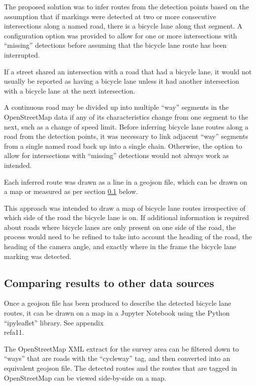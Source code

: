 \documentclass[11pt,twoside]{report}
\begin{document}
The proposed solution was to infer routes from the detection points based on the assumption that if markings were detected at two or more consecutive intersections along a named road, there is a bicycle lane along that segment.  A configuration option was provided to allow for one or more intersections with ``missing'' detections before assuming that the bicycle lane route has been interrupted.

If a street shared an intersection with a road that had a bicycle lane, it would not usually be reported as having a bicycle lane unless it had another intersection with a bicycle lane at the next intersection.

A continuous road may be divided up into multiple ``way'' segments in the OpenStreetMap data if any of its characteristics change from one segment to the next, such as a change of speed limit.  Before inferring bicycle lane routes along a road from the detection points, it was necessary to link adjacent ``way'' segments from a single named road back up into a single chain.  Otherwise, the option to allow for intersections with ``missing'' detections would not always work as intended.

Each inferred route was drawn as a line in a geojson file, which can be drawn on a map or measured as per section \ref{s:rq2d} below.

This approach was intended to draw a map of bicycle lane routes irrespective of which side of the road the bicycle lane is on.  If additional information is required about roads where bicycle lanes are only present on one side of the road, the process would need to be refined to take into account the heading of the road, the heading of the camera angle, and exactly where in the frame the bicycle lane marking was detected.


\subsection{Comparing results to other data sources}
\label{s:rq2d}

Once a geojson file has been produced to describe the detected bicycle lane routes, it can be drawn on a map in a Jupyter Notebook using the Python ``ipyleaflet'' library.  See appendix \\ref{a11}.

The OpenStreetMap XML extract for the survey area can be filtered down to ``ways'' that are roads with the ``cycleway'' tag, and then converted into an equivalent geojson file.  The detected routes and the routes that are tagged in OpenStreetMap can be viewed side-by-side on a map.
\end{document}
